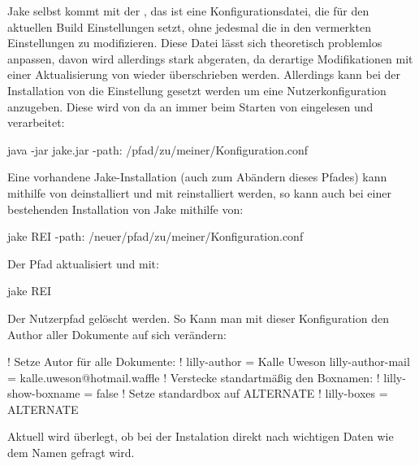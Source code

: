 \begin{bemerkung}[Standartkonfigurationsdateien]
    Jake selbst kommt mit der , das ist eine Konfigurationsdatei, die für den aktuellen Build Einstellungen setzt, ohne jedesmal die in den  vermerkten Einstellungen zu modifizieren. Diese Datei lässt sich theoretisch problemlos anpassen, davon wird allerdings stark abgeraten, da derartige Modifikationen mit einer Aktualisierung von \Jake wieder überschrieben werden. Allerdings kann bei der Installation von \Jake die Einstellung  gesetzt werden um eine Nutzerkonfiguration anzugeben. Diese wird von da an immer beim Starten von \Jake eingelesen und verarbeitet:
    \begin{bash*}
java -jar jake.jar -path: /pfad/zu/meiner/Konfiguration.conf
    \end{bash*}
    Eine vorhandene Jake-Installation (auch zum Abändern dieses Pfades) kann mithilfe von  deinstalliert und mit  reinstalliert werden, so kann auch bei einer bestehenden Installation von Jake mithilfe von:
    \begin{bash*}
jake REI -path: /neuer/pfad/zu/meiner/Konfiguration.conf
    \end{bash*}
    Der Pfad aktualisiert und mit:
    \begin{bash*}
jake REI
    \end{bash*}
    Der Nutzerpfad gelöscht werden. So Kann man mit dieser Konfiguration den Author aller Dokumente auf sich verändern:
    \begin{gepard}
! Setze Autor für alle Dokumente: !
lilly-author       = Kalle Uweson
lilly-author-mail  = kalle.uweson@hotmail.waffle
! Verstecke standartmäßig den Boxnamen: !
lilly-show-boxname = false
! Setze standardbox auf ALTERNATE !
lilly-boxes        = ALTERNATE
    \end{gepard}
    Aktuell wird überlegt, ob bei der Instalation direkt nach wichtigen Daten wie dem Namen gefragt wird. 
\end{bemerkung}

